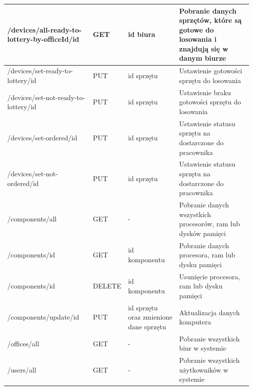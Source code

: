 \begin{table}[H]
\begin{tabularx}{\linewidth}{|X|l|p{3cm}|X|}
		/devices/all-ready-to-lottery-by-officeId/id& GET	& id biura & Pobranie danych sprzętów, które są gotowe do losowania i znajdują się w danym biurze\\
    \hline
		/devices/set-ready-to-lottery/id 		& PUT	& id sprzętu & Ustawienie gotowości sprzętu do losowania	\\
    \hline
		/devices/set-not-ready-to-lottery/id & PUT	& id sprzętu & Ustawienie braku gotowości sprzętu do losowania	\\
    \hline
		/devices/set-ordered/id & PUT	& id sprzętu & Ustawienie statusu sprzętu na dostarczone	do pracownika	\\
    \hline
		/devices/set-not-ordered/id & PUT	& id sprzętu & Ustawienie statusu sprzętu na dostarczone	do pracownika	\\
    \hline
		/components/all 	& GET & - & Pobranie danych wszystkich procesorów, ram lub dysków pamięci \\
		\hline
		/components/{id} & GET & id komponentu 	& Pobranie danych procesora, ram lub dysku pamięci\\
    \hline
		/components/{id}	& DELETE & id komponentu 	& Usunięcie procesora, ram lub dysku pamięci\\
    \hline
		 /components/update/id & PUT & id sprzętu oraz zmienione dane sprzętu& Aktualizacja danych komputera\\
		\hline
		 /offices/all	& GET & - & Pobranie wszystkich biur w systemie\\
		\hline
		/users/all	& GET & - & Pobranie wszystkich użytkowników w systemie\\
		\hline
		\end{tabularx}
		\end{table}

